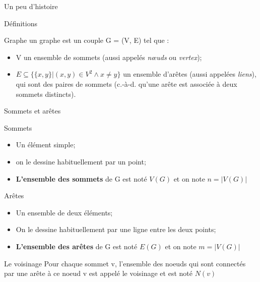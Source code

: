 \documentclass[10pt,xcolor=dvipsnames]{beamer}
\newcommand{\defin}[1]{\textcolor{darkspringgreen}{#1}}
\begin{document}
\begin{frame}{Un peu d'histoire}
\end{frame}

\begin{frame}{Définitions}
    \begin{exampleblock}{Graphe}
        un graphe est un couple G = (V, E) tel que :
    \begin{itemize}
        \item V un ensemble de sommets (aussi appelés \textit{nœuds} ou \textit{vertex});
        \item $E \subseteq \{\{x, y\} | (x, y) \in V^2 \wedge x \not\equal y\}$ un ensemble d'arêtes (aussi appelées \textit{liens}), qui sont des paires de sommets (c.-à-d. qu'une arête est associée à deux sommets distincts).
    \end{itemize}
    \end{exampleblock}
\end{frame}

\begin{frame}{Sommets et arêtes}
    \begin{exampleblock}{Sommets}
    \begin{itemize}
        \item Un élément simple;
        \item on le dessine habituellement par un point; 
        \item  \textbf{\defin{L'ensemble des sommets}} de G est noté $V(G)$ et on note $n = |V(G)|$
    \end{itemize}
    \end{exampleblock}
    
    \begin{exampleblock}{Arêtes}
    \begin{itemize}
        \item Un ensemble de deux éléments;
        \item On le dessine habituellement par une ligne entre les deux points;
        \item \textbf{\defin{L'ensemble des arêtes}} de G est noté $E(G)$ et on note $m = |V(G)|$
    \end{itemize}
    \end{exampleblock}
    
    \begin{exampleblock}{Le voisinage}
    Pour chaque sommet v, l'ensemble des noeuds qui sont connectés par une arête à ce noeud v est appelé le voisinage et est noté $N(v)$
    \end{exampleblock}
\end{frame}
\end{document}
